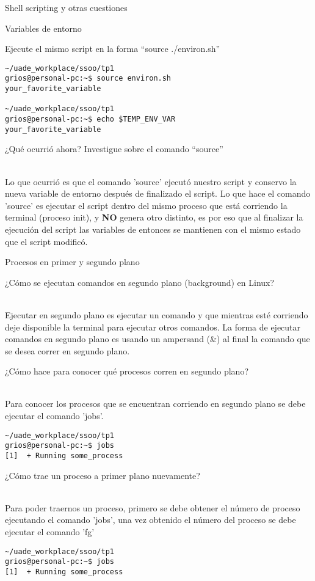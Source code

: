 \begin{section}{Shell scripting y otras cuestiones}
\begin{subsection}{Variables de entorno}
\begin{quoting}
Ejecute el mismo script en la forma “source ./environ.sh”
\end{quoting}
\begin{lstlisting}[style=Ubuntu]
~/uade_workplace/ssoo/tp1
grios@personal-pc:~$ source environ.sh 
your_favorite_variable 

~/uade_workplace/ssoo/tp1
grios@personal-pc:~$ echo $TEMP_ENV_VAR
your_favorite_variable
\end{lstlisting}

\begin{quoting}
¿Qué ocurrió ahora? Investigue sobre el comando “source”
\end{quoting}\\
Lo que ocurrió es que el comando 'source' ejecutó nuestro script y conservo la nueva variable de entorno después de finalizado el script. 
Lo que hace el comando 'source' es ejecutar el script dentro del mismo proceso que está corriendo la terminal (proceso init), y \textbf{NO} genera otro distinto, es por eso que al finalizar la ejecución del script las variables de entonces se mantienen con el mismo estado que el script modificó.
\end{subsection}

\begin{subsection}{Procesos en primer y segundo plano}

\begin{quoting}
¿Cómo se ejecutan comandos en segundo plano (background) en Linux?
\end{quoting}\\
Ejecutar en segundo plano es ejecutar un comando y que mientras esté corriendo deje disponible la terminal para ejecutar otros comandos. La forma de ejecutar comandos en segundo plano es usando un ampersand (\&) al final la comando que se desea correr en segundo plano.

\begin{quoting}
¿Cómo hace para conocer qué procesos corren en segundo plano?
\end{quoting}\\
Para conocer los procesos que se encuentran corriendo en segundo plano se debe ejecutar el comando 'jobs'.
\begin{lstlisting}[style=Ubuntu]
~/uade_workplace/ssoo/tp1
grios@personal-pc:~$ jobs
[1]  + Running some_process

\end{lstlisting}

\begin{quoting}
¿Cómo trae un proceso a primer plano nuevamente?
\end{quoting}\\
Para poder traernos un proceso, primero se debe obtener el número de proceso ejecutando el comando 'jobs', una vez obtenido el número del proceso se debe ejecutar el comando 'fg'
\begin{lstlisting}[style=Ubuntu]
~/uade_workplace/ssoo/tp1
grios@personal-pc:~$ jobs
[1]  + Running some_process


\end{lstlisting}
\end{subsection}
\end{section}
